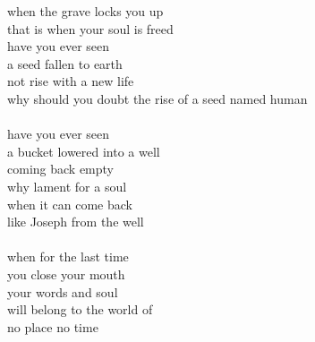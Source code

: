 \begin{flushleft}
\begin{paracol}{3}
when the grave locks you up\\
that is when your soul is freed\\
\switchcolumn[2]
have you ever seen\\
a seed fallen to earth\\
not rise with a new life\\
why should you doubt the rise
of a seed named human\\ \-\ \\
have you ever seen\\
a bucket lowered into a well\\
coming back empty\\
why lament for a soul\\
when it can come back\\
like Joseph from the well\\ \-\ \\
when for the last time\\
you close your mouth\\
your words and soul\\
will belong to the world of\\
no place no time
\end{paracol}
\end{flushleft}